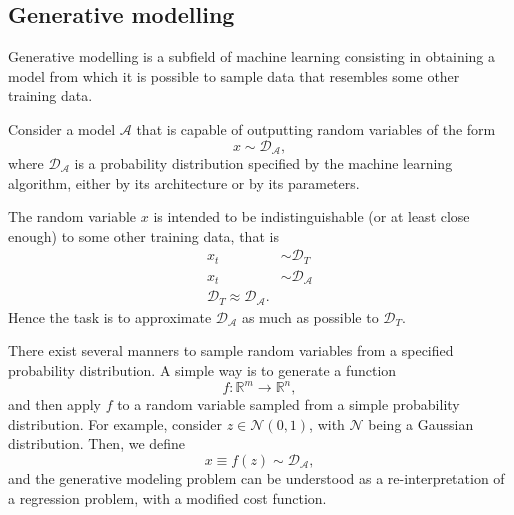 \documentclass[]{report}
\begin{document}
\subsection{Generative modelling}

Generative modelling is a subfield of machine learning consisting in obtaining a model from which it is possible to sample data that resembles some other training data. 

Consider a model $\mathcal A$ that is capable of outputting random variables of the form
\begin{equation}
x \sim \mathcal D_{\mathcal A}, 
\end{equation}
where $\mathcal D_{\mathcal A}$ is a probability distribution specified by the machine learning algorithm, either by its architecture or by its parameters. 

The random variable $x$ is intended to be indistinguishable (or at least close enough) to some other training data, that is
\begin{align}
x_t & \sim \mathcal D_T \\
x_t & \sim \mathcal D_{\mathcal A} \\
\mathcal D_T \approx \mathcal D_{\mathcal A}.
\end{align}
Hence the task is to approximate $\mathcal D_{\mathcal A}$ as much as possible to $\mathcal D_T$. 

There exist several manners to sample random variables from a specified probability distribution. A simple way is to generate a function 
\begin{equation}
f: \mathbb R^m \rightarrow \mathbb R^n, 
\end{equation}
and then apply $f$ to a random variable sampled from a simple probability distribution. For example, consider $z \in \mathcal N(0, 1)$, with $\mathcal N$ being a Gaussian distribution. Then, we define
\begin{equation}
x \equiv f(z) \sim \mathcal D_{\mathcal A}, 
\end{equation}
and the generative modeling problem can be understood as a re-interpretation of a regression problem, with a modified cost function. 
\end{document}
